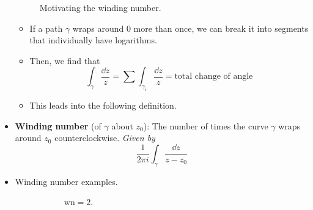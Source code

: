 \documentclass[../notes.tex]{subfiles}
\begin{document}
\begin{itemize}
\begin{figure}[h!]
        \caption{Motivating the winding number.}
        \label{fig:windingNumberMotivation}
    \end{figure}
    \begin{itemize}
        \item If a path $\gamma$ wraps around 0 more than once, we can break it into segments that individually have logarithms.
        \item Then, we find that
        \begin{equation*}
            \int_\gamma\frac{\dd{z}}{z} = \sum\int_{\gamma_i}\frac{\dd{z}}{z}
            = \text{total change of angle}
        \end{equation*}
        \item This leads into the following definition.
    \end{itemize}
    \item \textbf{Winding number} (of $\gamma$ about $z_0$): The number of times the curve $\gamma$ wraps around $z_0$ counterclockwise. \emph{Given by}
    \begin{equation*}
        \frac{1}{2\pi i}\int_\gamma\frac{\dd{z}}{z-z_0}
    \end{equation*}
    \item Winding number examples.
    \begin{figure}[H]
        \centering
        \begin{subfigure}[b]{0.25\linewidth}
            \centering
            \caption{$\text{wn}=2$.}
            \label{fig:windingNumberExa}
        \end{subfigure}
        \begin{subfigure}[b]{0.25\linewidth}
            \centering
\end{subfigure}
\end{figure}
\end{itemize}
\end{document}
